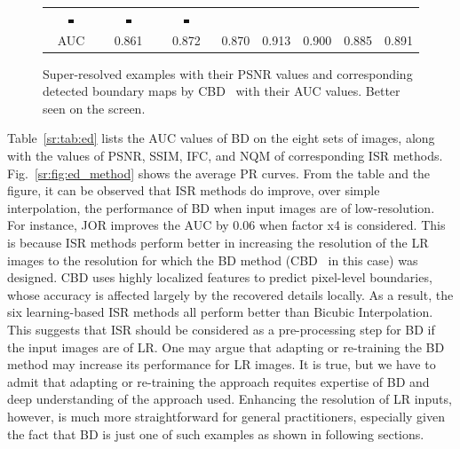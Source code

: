 \begin{figure} [tb]
\begin{tabular*}{\textwidth}{cccccccc}
 \includegraphics[width=0.12\textwidth]{./SR4VT/fig/ed/42049[6-A+]_cbd.jpg} &
 \includegraphics[width=0.12\textwidth]{./SR4VT/fig/ed/42049[7-JOR]_cbd.jpg} &
 \includegraphics[width=0.12\textwidth]{./SR4VT/fig/ed/42049[8-SRF]_cbd.jpg} \\
    AUC & 0.861 & 0.872 & 0.870 & 0.913 & 0.900 & 0.885 & 0.891 \\
\end{tabular*}
   \caption{Super-resolved examples with their PSNR values and corresponding 
detected boundary maps by CBD~\citep{isola2014crisp} with their AUC values. 
Better seen on the screen. }
\label{sr:fig:ed_cbd}
\end{figure}


Table~\ref{sr:tab:ed} lists the AUC values of BD on the eight sets of
images, along with the values of PSNR, SSIM, IFC, and NQM of
corresponding ISR methods. Fig.~\ref{sr:fig:ed_method} shows the average
PR curves. From the table and the figure, it can be observed that ISR
methods do improve, over simple interpolation, the performance of BD
when input images are of low-resolution. For instance, JOR improves
the AUC by 0.06 when factor x4 is considered. This is because ISR
methods perform better in increasing the resolution of the LR images
to the resolution for which the BD method (CBD~\citep{isola2014crisp}
in this case) was designed. CBD uses highly localized features to
predict pixel-level boundaries, whose accuracy is affected largely by
the recovered details locally. As a result, the six learning-based
ISR methods all perform better than Bicubic Interpolation.  This
suggests that ISR should be considered as a pre-processing step for 
BD if the input images are of LR. One may argue that adapting or
re-training the BD method may increase its performance for LR images.
It is true, but we have to admit that adapting or re-training the
approach requites expertise of BD and deep understanding of the
approach used. Enhancing the resolution of LR inputs, however, is much
more straightforward for general practitioners, especially given the fact that BD is just one of
such examples as shown in following sections.

